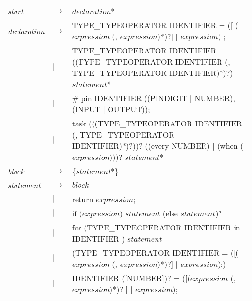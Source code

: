 \begin{table}[htb!]
    \centering
    \begin{tabular}{ll>{\arraybackslash}p{10cm}}
        \textit{start}       & $\to$  & $declaration$*                                                                                                                            \\
        \textit{declaration} & $\to$  & TYPE\_TYPEOPERATOR IDENTIFIER = ([ ($expression$ (, $expression$)*)?] $\mid$ $expression$) ;                                              \\
                             & $\mid$ & TYPE\_TYPEOPERATOR IDENTIFIER ((TYPE\_TYPEOPERATOR IDENTIFIER (, TYPE\_TYPEOPERATOR IDENTIFIER)*)?) $statement$*                          \\
                             & $\mid$ & \# pin IDENTIFIER ((PINDIGIT $\mid$ NUMBER), (INPUT $\mid$ OUTPUT));                                                                          \\
                             & $\mid$ & task (((TYPE\_TYPEOPERATOR IDENTIFIER (, TYPE\_TYPEOPERATOR IDENTIFIER)*)?))? ((every NUMBER) $\mid$ (when ($expression$)))? $statement$* \\
        \textit{block}       & $\to$  & \{$statement$*\}                                                                                                                          \\
        \textit{statement}   & $\to$  & $block$                                                                                                                                   \\
                             & $\mid$ & return $expression$;                                                                                                                      \\
                             & $\mid$ & if ($expression$) $statement$ (else $statement$)?                                                                                         \\
                             & $\mid$ & for (TYPE\_TYPEOPERATOR IDENTIFIER in IDENTIFIER ) $statement$                                                                            \\
                             & $\mid$ & (TYPE\_TYPEOPERATOR IDENTIFIER = ([($expression$ (, $expression$)*)?] $\mid$ $expression$);)                                              \\
                             & $\mid$ & IDENTIFIER ([NUMBER])? = ([($expression$ (, $expression$)*)? ] $\mid$ $expression$);                                                      \\

\end{tabular}
\end{table}
